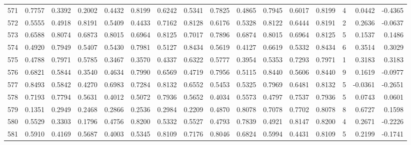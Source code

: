 \begin{tabular}{lrrrrrrrrrrrrrrr}
571 &      0.7757 &  0.3392 &  0.2002 &  0.4432 &  0.8199 &  0.6242 &  0.5341 &  0.7825 &  0.4865 &  0.7945 &   0.6017 &     0.8199 &      4 &                    0.0442 &                    -0.4365 \\
572 &      0.5555 &  0.4918 &  0.8191 &  0.5409 &  0.4433 &  0.7162 &  0.8128 &  0.6176 &  0.5328 &  0.8122 &   0.6444 &     0.8191 &      2 &                    0.2636 &                    -0.0637 \\
573 &      0.6588 &  0.8074 &  0.6873 &  0.8015 &  0.6964 &  0.8125 &  0.7017 &  0.7896 &  0.6874 &  0.8015 &   0.6964 &     0.8125 &      5 &                    0.1537 &                     0.1486 \\
574 &      0.4920 &  0.7949 &  0.5407 &  0.5430 &  0.7981 &  0.5127 &  0.8434 &  0.5619 &  0.4127 &  0.6619 &   0.5332 &     0.8434 &      6 &                    0.3514 &                     0.3029 \\
575 &      0.4788 &  0.7971 &  0.5785 &  0.3467 &  0.3570 &  0.4337 &  0.6322 &  0.5777 &  0.3954 &  0.5353 &   0.7293 &     0.7971 &      1 &                    0.3183 &                     0.3183 \\
576 &      0.6821 &  0.5844 &  0.3540 &  0.4634 &  0.7990 &  0.6569 &  0.4719 &  0.7956 &  0.5115 &  0.8440 &   0.5606 &     0.8440 &      9 &                    0.1619 &                    -0.0977 \\
577 &      0.8493 &  0.5842 &  0.4270 &  0.6983 &  0.7284 &  0.8132 &  0.6552 &  0.5453 &  0.5325 &  0.7969 &   0.6481 &     0.8132 &      5 &                   -0.0361 &                    -0.2651 \\
578 &      0.7193 &  0.7794 &  0.5631 &  0.4012 &  0.5072 &  0.7936 &  0.5652 &  0.4034 &  0.5573 &  0.4797 &   0.7537 &     0.7936 &      5 &                    0.0743 &                     0.0601 \\
579 &      0.1351 &  0.2949 &  0.2468 &  0.2866 &  0.2536 &  0.2984 &  0.2209 &  0.4870 &  0.8078 &  0.7078 &   0.7702 &     0.8078 &      8 &                    0.6727 &                     0.1598 \\
580 &      0.5529 &  0.3303 &  0.1796 &  0.4756 &  0.8200 &  0.5332 &  0.5527 &  0.4793 &  0.7839 &  0.4921 &   0.8147 &     0.8200 &      4 &                    0.2671 &                    -0.2226 \\
581 &      0.5910 &  0.4169 &  0.5687 &  0.4003 &  0.5345 &  0.8109 &  0.7176 &  0.8046 &  0.6824 &  0.5994 &   0.4431 &     0.8109 &      5 &                    0.2199 &                    -0.1741 \\

\end{tabular}

